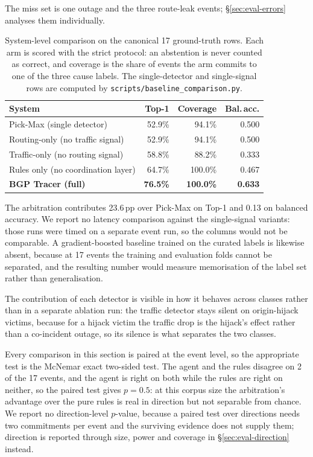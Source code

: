 The miss set is one outage and the three route-leak events;
\S\ref{sec:eval-errors} analyses them individually.

\begin{table}[t]
\centering
\caption{System-level comparison on the canonical 17 ground-truth rows.
Each arm is scored with the strict protocol: an abstention is never
counted as correct, and coverage is the share of events the arm commits
to one of the three cause labels. The single-detector and single-signal
rows are computed by \texttt{scripts/baseline\_comparison.py}.}
\label{tab:baseline}
\small
\begin{tabular}{l r r r}
\hline
\textbf{System} & \textbf{Top-1} & \textbf{Coverage} & \textbf{Bal.\,acc.} \\
\hline
Pick-Max (single detector)          & 52.9\% & 94.1\% & 0.500 \\
Routing-only (no traffic signal)    & 52.9\% & 94.1\% & 0.500 \\
Traffic-only (no routing signal)    & 58.8\% & 88.2\% & 0.333 \\
Rules only (no coordination layer)  & 64.7\% & 100.0\% & 0.467 \\
\hline
\textbf{BGP Tracer (full)}          & \textbf{76.5\%} & \textbf{100.0\%} & \textbf{0.633} \\
\hline
\end{tabular}
\end{table}

The arbitration contributes 23.6\,pp over Pick-Max on Top-1 and 0.13 on
balanced accuracy. We report no latency comparison against the
single-signal variants: those runs were timed on a separate event run, so
the columns would not be comparable. A gradient-boosted baseline trained
on the curated labels is likewise absent, because at 17 events the
training and evaluation folds cannot be separated, and the resulting
number would measure memorisation of the label set rather than
generalisation.

The contribution of each detector is visible in how it behaves across
classes rather than in a separate ablation run: the traffic detector stays
silent on origin-hijack victims, because for a hijack victim the traffic
drop is the hijack's effect rather than a co-incident outage, so its
silence is what separates the two classes.

Every comparison in this section is paired at the event level, so the
appropriate test is the McNemar exact two-sided test. The agent and the
rules disagree on 2 of the 17 events, and the agent is right on both
while the rules are right on neither, so the paired test gives $p=0.5$:
at this corpus size the arbitration's advantage over the pure rules is
real in direction but not separable from chance. We report no
direction-level $p$-value, because a paired test over directions needs two
commitments per event and the surviving evidence does not supply them;
direction is reported through size, power and coverage in
\S\ref{sec:eval-direction} instead.

